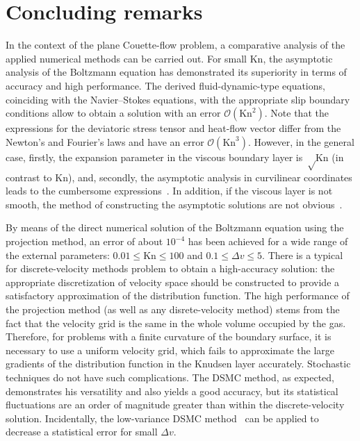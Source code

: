 \documentclass[aip,pof,preprint]{revtex4-1}
\newcommand{\Kn}{\mathrm{Kn}}
\newcommand{\OO}[1]{\mathcal{O}(#1)}
\begin{document}
\section{Concluding remarks}

In the context of the plane Couette-flow problem,
a comparative analysis of the applied numerical methods can be carried out.
For small \(\Kn\), the asymptotic analysis of the Boltzmann equation has demonstrated
its superiority in terms of accuracy and high performance.
The derived fluid-dynamic-type equations, coinciding with the Navier--Stokes equations,
with the appropriate slip boundary conditions allow to obtain
a solution with an error \(\OO{\Kn^2}\).
Note that the expressions for the deviatoric stress tensor and heat-flow vector
differ from the Newton's and Fourier's laws and have an error \(\OO{\Kn^3}\).
However, in the general case, firstly, the expansion parameter in the viscous boundary layer
is \(\sqrt\Kn\) (in contrast to \(\Kn\)), and, secondly,
the asymptotic analysis in curvilinear coordinates leads to the cumbersome expressions~\cite{Sone2002}.
In addition, if the viscous layer is not smooth,
the method of constructing the asymptotic solutions are not obvious~\cite{Aoki2014}.

By means of the direct numerical solution of the Boltzmann equation using the projection method,
an error of about \(10^{-4}\) has been achieved for a wide range of the external parameters:
\(0.01 \le \Kn \le 100\) and \(0.1 \le \Delta{v} \le 5\).
There is a typical for discrete-velocity methods problem to obtain a high-accuracy solution:
the appropriate discretization of velocity space should be constructed
to provide a satisfactory approximation of the distribution function.
The high performance of the projection method (as well as any disrete-velocity method)
stems from the fact that the velocity grid is the same in the whole volume occupied by the gas.
Therefore, for problems with a finite curvature of the boundary surface,
it is necessary to use a uniform velocity grid, which fails to approximate
the large gradients of the distribution function in the Knudsen layer accurately.
Stochastic techniques do not have such complications.
The DSMC method, as expected, demonstrates his versatility
and also yields a good accuracy, but its statistical fluctuations
are an order of magnitude greater than within the discrete-velocity solution.
Incidentally, the low-variance DSMC method~\cite{Hadji2011}
can be applied to decrease a statistical error for small \(\Delta{v}\).
\end{document}

